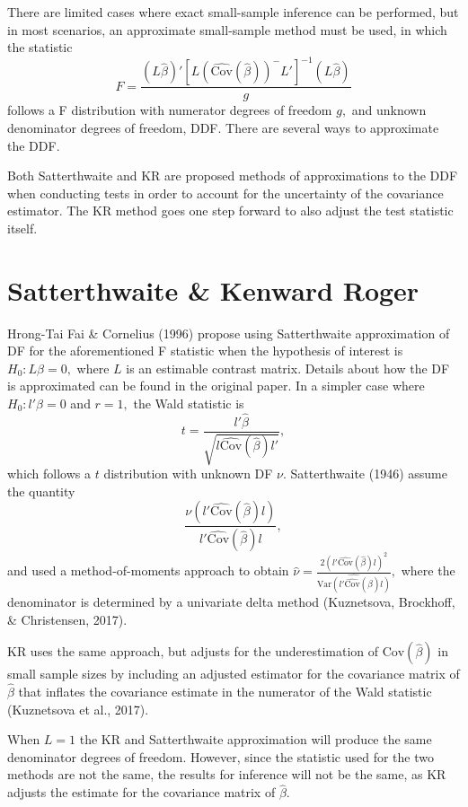 \documentclass[12pt, twoside]{amherstthesis}
\begin{document}
There are limited cases where exact small-sample inference can be performed, but in most scenarios, an approximate small-sample method must be used, in which the statistic \[F = \frac{(L\hat\beta)'[L(\widehat {\text{Cov}}(\hat\beta))^-L']^{-1}(L\hat\beta)}{g}\] follows a F distribution with numerator degrees of freedom \(g,\) and unknown denominator degrees of freedom, DDF. There are several ways to approximate the DDF.

Both Satterthwaite and KR are proposed methods of approximations to the DDF when conducting tests in order to account for the uncertainty of the covariance estimator. The KR method goes one step forward to also adjust the test statistic itself.

\hypertarget{satterthwaite-kenward-roger}{%
\section{Satterthwaite \& Kenward Roger}\label{satterthwaite-kenward-roger}}

Hrong-Tai Fai \& Cornelius (1996) propose using Satterthwaite approximation of DF for the aforementioned F statistic when the hypothesis of interest is \(H_0 : L\beta = 0,\) where \(L\) is an estimable contrast matrix. Details about how the DF is approximated can be found in the original paper. In a simpler case where \(H_0 :l'\beta = 0\) and \(r = 1,\) the Wald statistic is \[t = \frac{l'\hat\beta}{\sqrt{l\widehat{\text{Cov}}(\hat\beta)l'}},\] which follows a \(t\) distribution with unknown DF \(\nu.\) Satterthwaite (1946) assume the quantity \[\frac{\nu(l'\widehat{\text{Cov}}(\hat\beta)l)}{l'\widehat{\text{Cov}}(\hat\beta)l},\] and used a method-of-moments approach to obtain \(\hat\nu = \frac{2(l'\widehat{\text{Cov}}(\hat\beta)l)^2}{\widehat{\text{Var}(l'\widehat{\text{Cov}}(\hat\beta)l)}},\) where the denominator is determined by a univariate delta method (Kuznetsova, Brockhoff, \& Christensen, 2017).

KR uses the same approach, but adjusts for the underestimation of \(\text{Cov}(\hat\beta)\) in small sample sizes by including an adjusted estimator for the covariance matrix of \(\hat\beta\) that inflates the covariance estimate in the numerator of the Wald statistic (Kuznetsova et al., 2017).

When \(L=1\) the KR and Satterthwaite approximation will produce the same denominator degrees of freedom. However, since the statistic used for the two methods are not the same, the results for inference will not be the same, as KR adjusts the estimate for the covariance matrix of \(\hat\beta.\)
\end{document}
